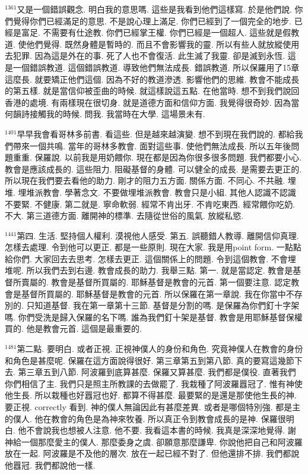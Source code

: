 \documentclass{book}
\begin{document}
$^{1361}$又是一個錯誤觀念.
明白我的意思嗎.
這些是我看到他們這樣寫.
於是他們說.
你們覺得你們已經滿足的意思.
不是說心理上滿足.
你們已經到了一個完全的地步.
已經是富足.
不需要有仕途教.
你們已經掌王權.
你們已經是一個超人.
這些就是假教道.
使他們覺得.
既然身體是暫時的.
而且不會影響我的靈.
所以有些人就放縱使用去犯罪.
因為這是外在的事.
死了人也不會復活.
此生滅了我靈.
卻是滅到永恆.
這是一個錯誤教道.
這個錯誤教道.
導致他們無法成長.
錯誤教道.
所以保羅用了15章這麼長.
就要矯正他們這個.
因為不好的教道滲透.
影響他們的思維.
教會不能成長的第五樣.
就是當信仰被歪曲的時候.
就這樣說這五點.
在他當時.
想不到我們說回香港的處境.
有兩樣現在很切身.
就是道德方面和信仰方面.
我覺得很奇妙.
因為當何韻詩接觸我的時候.
問我.
我當時在大學.
這場景未有.

$^{1401}$早早我會看哥林多前書.
看這些.
但是越來越演變.
想不到現在我們說的.
都給我們帶來一個共鳴.
當年的哥林多教會.
面對這些事.
使他們無法成長.
所以五年後問題重重.
保羅說.
以前我是用奶餵你.
現在都是因為你很多很多問題.
我們都要小心.
教會是應該成長的.
這些阻力.
阻礙基督的身體.
可以健全的成長.
是需要去更正的.
所以現在我們要去看他的助力.
剛才的阻力五方面.
關係方面.
不同心.
不共融.
埋堆.
埋堆派教會.
學著念文.
不要做埋堆派教會.
教會只是小組.
其他人認識不認識不要緊.
不健康.
第二就是.
寧命軟弱.
經常不肯出牙.
不肯吃東西.
經常餵你吃奶.
不大.
第三道德方面.
離開神的標準.
去隨從世俗的風氣.
放縱私慾.

$^{1441}$第四.
生活.
堅持個人權利.
漠視他人感受.
第五.
誤聽錯人教導.
離開信仰真理.
怎樣去處理.
令到他可以更正.
都是一些原則.
現在大家.
我是用point form.
一點點給你們.
大家回去去思考.
怎樣去更正.
這個關係上的問題.
令到這個教會.
不會埋堆呢.
所以我們去到右邊.
教會成長的助力.
我舉三點.
第一.
就是當認定.
教會是基督所賣屬的.
教會是基督所買屬的.
耶穌基督是教會的元首.
第一個要注意.
認定教會是基督所買屬的.
耶穌基督是教會的元首.
所以保羅在第一章說.
我在你當中不存別的.
只知道基督.
我在第一章第十三節.
基督是分割的嗎.
是保羅為你們釘十字架嗎.
你們受洗是歸入保羅的名下嗎.
誰為我們釘十架是基督.
教會是用耶穌基督保權買的.
他是教會元首.
這個是最重要的.

$^{1481}$第二點.
要明白.
或者正視.
正視神僕人的身份和角色.
究竟神僕人在教會的身份和角色是甚麼呢.
保羅在這方面說得很好.
第三章第五到第八節.
真的要寫這幾節下去.
第三章五到八節.
阿波羅到底算甚麼.
保羅又算甚麼.
我們都是僕役.
直著我們你們相信了主.
我們只是照主所教課的去做罷了.
我栽種了阿波羅囂冠了.
惟有神使他生長.
所以栽種也好囂冠也好.
都算不得甚麼.
最要緊的是還是那使他生長的神.
要正視.
correctly 看到.
神的僕人無論因此有甚麼差異.
或者是哪個特別強.
都是主的僕人.
他在教會的角色是為神來牧養.
所以真正令到教會成長的是神.
保羅很明白.
他不會說我也想被人注意.
他不要.
我看這本書的時候.
我真是深深地覺得.
謝神給一個那麼愛主的僕人.
那麼委身之虞.
卻願意那麼謙卑.
你說他把自己和阿波羅放在一起.
阿波羅是不及他的層次.
放在一起已經不對了.
但他還排不排.
我們都說他囂冠.
我們都說他一樣.
\end{document}
